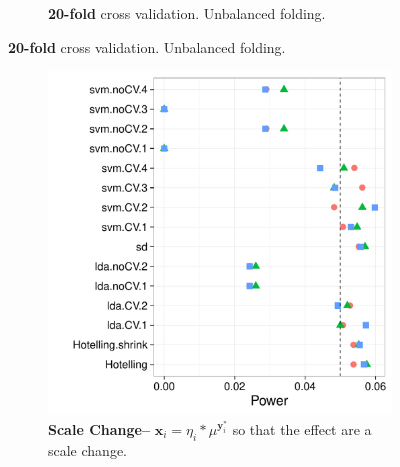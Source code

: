 \documentclass[12pt,a4paper]{article}
\theoremstyle{definition}
\newcommand{\rv}[1]{\mathbf{#1}} %
\newcommand{\x}{\rv x} %
\newcommand{\y}{\rv y} %
\newcommand{\mycaption}{Simulation details in Appendix~\ref{apx:simulation_details} except the changes in the sub-captions.}
\begin{document}
\begin{figure}[h]
\begin{subfigure}{.5\textwidth}
	  \caption{\textbf{20-fold} cross validation. Unbalanced folding.} 
	\label{fig:n_folds_unbalanced_2}
	\end{subfigure}
\end{figure}



\begin{figure}[h]
\centering
\caption{\mycaption}	
	\begin{subfigure}{.5\textwidth}
	  \centering
	  \includegraphics[width=1\linewidth]{"art/2016-07-30 10:33:05"}
	  \caption{\textbf{Scale Change--} $\x_i =  \eta_i * \mu^ {\y^*_i}$ so that the effect are a scale change.}  
	\label{fig:scale_change}
	\end{subfigure}%
	\begin{subfigure}{.5\textwidth}
	  \centering

\end{subfigure}
\end{figure}
\end{document}
